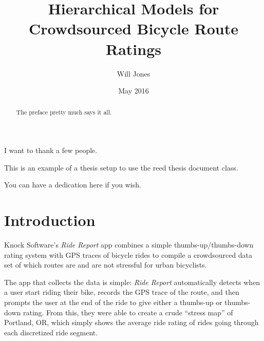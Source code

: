 \documentclass[12pt,twoside]{reedthesis}
\title{Hierarchical Models for Crowdsourced Bicycle Route Ratings}
\author{Will Jones}
\date{May 2016}
\begin{document}
      \maketitle
  
  \frontmatter %
  \pagestyle{empty} %

      \begin{acknowledgements}
      I want to thank a few people.
    \end{acknowledgements}
  
      \begin{preface}
      This is an example of a thesis setup to use the reed thesis document
      class.
    \end{preface}
  

      \hypersetup{linkcolor=black}
    \setcounter{tocdepth}{2}
    \tableofcontents
  
      \listoftables
  
      \listoffigures
  
      \begin{abstract}
      The preface pretty much says it all.
    \end{abstract}
  
      \begin{dedication}
      You can have a dedication here if you wish.
    \end{dedication}
  
  \mainmatter %
  \pagestyle{fancyplain} %

  \chapter*{Introduction}\label{introduction}
  
  Knock Software's \emph{Ride Report} app combines a simple
  thumbs-up/thumbs-down rating system with GPS traces of bicycle rides to
  compile a crowdsourced data set of which routes are and are not
  stressful for urban bicyclists.
  
  The app that collects the data is simple: \emph{Ride Report}
  automatically detects when a user start riding their bike, records the
  GPS trace of the route, and then prompts the user at the end of the ride
  to give either a thumbs-up or thumbs-down rating. From this, they were
  able to create a crude ``stress map'' of Portland, OR, which simply
  shows the average ride rating of rides going through each discretized
  ride segment.
  
\end{document}
